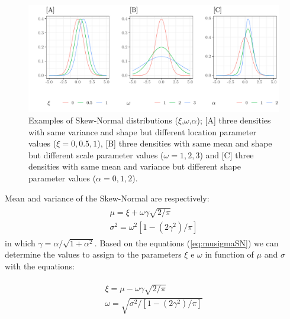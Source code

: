 \documentclass[twocolumn]{article}\usepackage[]{graphicx}\usepackage[]{xcolor}
\makeatletter
\def\maxwidth{ %
  \ifdim\Gin@nat@width>\linewidth
    \linewidth
  \else
    \Gin@nat@width
  \fi
}
\newenvironment{knitrout}{}{} %
\makeatother
\begin{document}
\begin{figure}[!h]
\begin{knitrout}
\color{fgcolor}

{\centering \includegraphics[width=\maxwidth]{figure/scenari-1} 

}


\end{knitrout}
\caption{Examples of Skew-Normal distributions ($\xi$,$\omega$,$\alpha$); [A] three densities with same variance and shape but different location parameter values ($\xi = 0, 0.5, 1$), [B] three densities with same mean and shape but different scale parameter values ($\omega = 1, 2, 3$) and [C] three densities with same mean and variance but different shape parameter values ($\alpha = 0, 1, 2$). \label{fig:scenari}}
\end{figure}

Mean and variance of the Skew-Normal are respectively: 
\begin{eqnarray}\label{eq:musigmaSN}
\begin{array}{l}
\mu = \xi + \omega \gamma \sqrt{2/\pi} \\
\sigma^2 = \omega^2 [1- (2\gamma^2)/\pi]
\end{array}
\end{eqnarray}
in which $\gamma = \alpha / \sqrt{1 + \alpha^2}$. Based on the equations (\ref{eq:musigmaSN}) we can determine the values to assign to the parameters $\xi$ e $\omega$ in function of $\mu$ and $\sigma$ with the equations:

\begin{eqnarray}\label{eq:xiomegaSN}
\begin{array}{l}
 \xi = \mu - \omega \gamma \sqrt{2/\pi} \\
 \omega = \sqrt{\sigma^2/ [1- (2\gamma^2)/\pi]}
\end{array}
\end{eqnarray}
\end{document}
